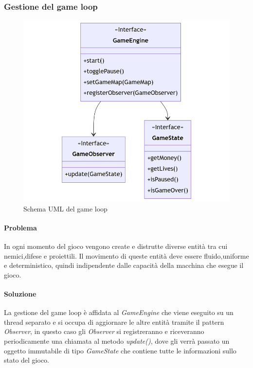 \documentclass[a4paper,12pt]{report}
\begin{document}
\subsubsection{Gestione del game loop}

\begin{figure}[H]
	\centering{}
	\includegraphics[width=\textwidth]{GameLoop}
	\caption{Schema UML del game loop}
	\label{fig:GameLoop}
\end{figure}

\paragraph{Problema} In ogni momento del gioco vengono create e distrutte diverse entità tra cui nemici,difese e proiettili.
Il movimento di queste entità deve essere fluido,uniforme e deterministico, quindi indipendente dalle capacità della macchina 
che esegue il gioco.

\paragraph{Soluzione} La gestione del game loop è affidata al \textit{GameEngine} che viene eseguito su un thread separato e 
si occupa di aggiornare le altre entità tramite il pattern \textit{Observer}, in questo caso gli \textit{Observer} si registreranno
e riceveranno periodicamente una chiamata al metodo \textit{update()}, dove gli verrà passato un oggetto immutabile di tipo
\textit{GameState} che contiene tutte le informazioni sullo stato del gioco.
\end{document}
